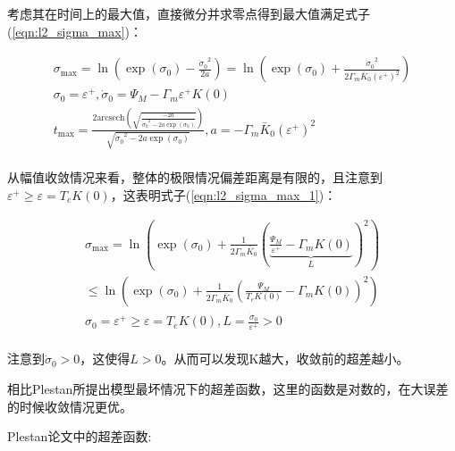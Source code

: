 考虑其在时间上的最大值，直接微分并求零点得到最大值满足式子(\ref{eqn:l2_sigma_max})：

\begin{equation}
    \begin{array}{c}
        \sigma _{\max}=\ln \left( \exp \left( \sigma _0 \right) -\frac{{\dot{\sigma}_0}^2}{2a} \right) =\ln \left( \exp \left( \sigma _0 \right) +\frac{{\dot{\sigma}_0}^2}{2\varGamma _m\bar{K}_0\left( \varepsilon ^+ \right) ^2} \right)\\
        \sigma _0=\varepsilon ^+, \dot{\sigma}_0=\varPsi _M-\varGamma _m\varepsilon ^+K\left( 0 \right)\\
        t_{\max}=\frac{2\mathrm{arcsech} \left( \sqrt{\frac{-2a}{{\dot{\sigma}_0}^2-2a\exp \left( \sigma _0 \right)}} \right)}{\sqrt{{\dot{\sigma}_0}^2-2a\exp \left( \sigma _0 \right)}}, a=-\varGamma _m\bar{K}_0\left( \varepsilon ^+ \right) ^2\\
    \end{array}
    \label{eqn:l2_sigma_max}
\end{equation}

从幅值收敛情况来看，整体的极限情况偏差距离是有限的，且注意到$\varepsilon ^+\ge \varepsilon =T_eK\left( 0 \right)$，这表明式子(\ref{eqn:l2_sigma_max_1})：

\begin{equation}
    \begin{array}{c}
        \sigma _{\max}=\ln \left( \exp \left( \sigma _0 \right) +\frac{1}{2\varGamma _m\bar{K}_0}\left( \underset{L}{\underbrace{\frac{\varPsi _M}{\varepsilon ^+}-\varGamma _mK\left( 0 \right) }} \right) ^2 \right)\\
        \le \ln \left( \exp \left( \sigma _0 \right) +\frac{1}{2\varGamma _m\bar{K}_0}\left( \frac{\varPsi _M}{T_eK\left( 0 \right)}-\varGamma _mK\left( 0 \right) \right) ^2 \right)\\
        \sigma _0=\varepsilon ^+\ge \varepsilon =T_eK\left( 0 \right) , L=\frac{\dot{\sigma}_0}{\varepsilon ^+}>0\\
    \end{array}
    \label{eqn:l2_sigma_max_1}
\end{equation}

注意到$\dot{\sigma}_0>0$，这使得$L>0$。从而可以发现K越大，收敛前的超差越小。

相比Plestan所提出模型最坏情况下的超差函数，这里的函数是对数的，在大误差的时候收敛情况更优。

Plestan论文中的超差函数\cite{plestanNewMethodologiesAdaptive2010}:

